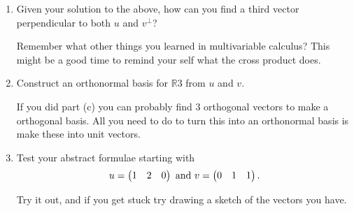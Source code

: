 {\begin{enumerate}
Now you finish simplifying and see if you can figure out what $\theta $ has to be.

\item Given your solution to the above, how can you find a third vector perpendicular to both $u$ and $v^\bot$?

Remember what other things you learned in multivariable calculus? This might be a good time to remind your self what the cross product does.

\item  Construct an orthonormal basis for $\mathbb{R}3$ from $u$ and $v$.

If you did part (c) you can probably find 3 orthogonal vectors to make a orthogonal basis. All you need to do to turn this into an orthonormal  basis is make these into unit vectors. 

\item  Test your abstract formulae starting with 
\[
u=\begin{pmatrix} 1 & 2 & 0 \end{pmatrix} \text{ and } v=\begin{pmatrix} 0 & 1 & 1 \end{pmatrix}.
\]

Try it out, and if you get stuck try drawing a sketch of the vectors you have.



\end{enumerate}


} %

